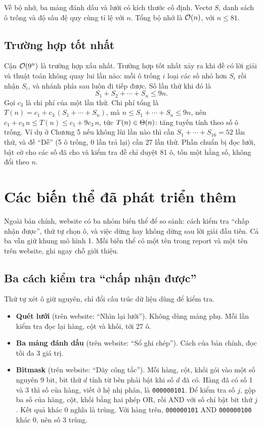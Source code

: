 Về bộ nhớ, ba mảng đánh dấu và lưới có kích thước cố định. Vectơ \(S\), danh sách ô trống và độ sâu đệ quy cùng tỉ lệ với \(n\). Tổng bộ nhớ là \(\mathcal{O}\!\left(n\right)\), với \(n \le 81\).

\subsection*{Trường hợp tốt nhất}

Cận \(\mathcal{O}\!\left(9^n\right)\) là trường hợp xấu nhất. Trường hợp tốt nhất xảy ra khi đề có lời giải và thuật toán không quay lui lần nào: mỗi ô trống \(i\) loại các số nhỏ hơn \(S_i\) rồi nhận \(S_i\), và nhánh phía sau luôn đi tiếp được. Số lần thử khi đó là
\[
  S_1 + S_2 + \cdots + S_n \le 9n.
\]
Gọi \(c_3\) là chi phí của một lần thử. Chi phí tổng là \(T(n) = c_1 + c_3\,(S_1 + \cdots + S_n)\), mà \(n \le S_1 + \cdots + S_n \le 9n\), nên \(c_1 + c_3\,n \le T(n) \le c_1 + 9c_3\,n\), tức \(T(n) \in \Theta\!\left(n\right)\): tăng tuyến tính theo số ô trống. Ví dụ ở Chương 5 nếu không lùi lần nào thì cần \(S_1 + \cdots + S_{16} = 52\) lần thử, và đề ``Dễ'' (5 ô trống, 0 lần trả lại) cần 27 lần thử. Phần chuẩn bị đọc lưới, bật cờ cho các số đã cho và kiểm tra đề chỉ duyệt 81 ô, tốn một hằng số, không đổi theo \(n\).

\section{Các biến thể đã phát triển thêm}
\label{sec:variants}

Ngoài bản chính, website có ba nhóm biến thể để so sánh: cách kiểm tra ``chấp nhận được'', thứ tự chọn ô, và việc dừng hay không dừng sau lời giải đầu tiên. Cả ba vẫn giữ khung mô hình 1. Mỗi biến thể có một tên trong report và một tên trên website, ghi ngay chỗ giới thiệu.

\subsection*{Ba cách kiểm tra ``chấp nhận được''}

Thứ tự xét ô giữ nguyên, chỉ đổi cấu trúc dữ liệu dùng để kiểm tra.

\begin{itemize}
  \item \textbf{Quét lưới} (trên website: ``Nhìn lại lưới''). Không dùng mảng phụ. Mỗi lần kiểm tra đọc lại hàng, cột và khối, tới 27 ô.
  \item \textbf{Ba mảng đánh dấu} (trên website: ``Sổ ghi chép''). Cách của bản chính, đọc tối đa 3 giá trị.
  \item \textbf{Bitmask} (trên website: ``Dãy công tắc''). Mỗi hàng, cột, khối gói vào một số nguyên 9 bit, bit thứ \(d\) tính từ bên phải bật khi số \(d\) đã có. Hàng đã có số 1 và 3 thì số của hàng, viết ở hệ nhị phân, là \texttt{000000101}. Để kiểm tra số \(j\), gộp ba số của hàng, cột, khối bằng hai phép OR, rồi AND với số chỉ bật bit thứ \(j\). Kết quả khác 0 nghĩa là trùng. Với hàng trên, \texttt{000000101} AND \texttt{000000100} khác 0, nên số 3 trùng.
\end{itemize}

